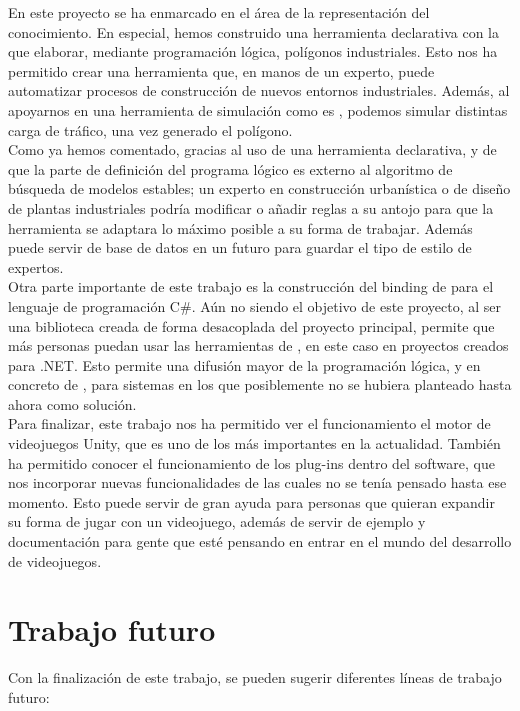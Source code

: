 En este proyecto se ha enmarcado en el área de la representación del conocimiento. En especial, hemos construido una herramienta declarativa con la que elaborar, mediante programación lógica, polígonos industriales. Esto nos ha permitido crear una herramienta que, en manos de un experto, puede automatizar procesos de construcción de nuevos entornos industriales. Además, al apoyarnos en una herramienta de simulación como es \cities, podemos simular distintas carga de tráfico, una vez generado el polígono. \\

Como ya hemos comentado, gracias al uso de una herramienta declarativa, y de que la parte de definición del programa lógico es externo al algoritmo de búsqueda de modelos estables; un experto en construcción urbanística o de diseño de plantas industriales podría modificar o añadir reglas a su antojo para que la herramienta se adaptara lo máximo posible a su forma de trabajar. Además puede servir de base de datos en un futuro para guardar el tipo de estilo de expertos. \\

Otra parte importante de este trabajo es la construcción del binding de \clingo para el lenguaje de programación C\#. Aún no siendo el objetivo de este proyecto, al ser una biblioteca creada de forma desacoplada del proyecto principal, permite que más personas puedan usar las herramientas de \clingo, en este caso en proyectos creados para .NET. Esto permite una difusión mayor de la programación lógica, y en concreto de \asp, para sistemas en los que posiblemente no se hubiera planteado hasta ahora como solución. \\

Para finalizar, este trabajo nos ha permitido ver el funcionamiento el motor de videojuegos Unity, que es uno de los más importantes en la actualidad. También ha permitido conocer el funcionamiento de los plug-ins dentro del software, que nos incorporar nuevas funcionalidades de las cuales no se tenía pensado hasta ese momento. Esto puede servir de gran ayuda para personas que quieran expandir su forma de jugar con un videojuego, además de servir de ejemplo y documentación para gente que esté pensando en entrar en el mundo del desarrollo de videojuegos.

\section{Trabajo futuro}

Con la finalización de este trabajo, se pueden sugerir diferentes líneas de trabajo futuro:

